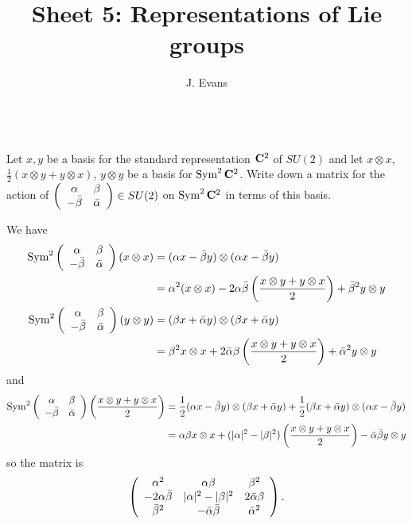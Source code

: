 \documentclass[12pt]{article}
\title{Sheet 5: Representations of Lie groups}
\author{J. Evans}
\date{}
\begin{document}
\maketitle

\begin{question}\ \\
Let $x,y$ be a basis for the standard representation $\mathbf{C}^2$ of $SU(2)$ and let $x\otimes x$, $\frac{1}{2}(x\otimes y+y\otimes x)$, $y\otimes y$ be a basis for $\operatorname{Sym}^2\mathbf{C}^2$. Write down a matrix for the action of $\left(\begin{array}{cc}\alpha & \beta\\ -\bar{\beta} & \bar{\alpha}\end{array}\right)\in SU(2)$ on $\operatorname{Sym}^2\mathbf{C}^2$ in terms of this basis.
\end{question}

\begin{answer}
We have
\begin{align*}
\operatorname{Sym}^2\left(\begin{array}{cc}\alpha & \beta\\ -\bar{\beta} & \bar{\alpha}\end{array}\right)(x\otimes x)&=(\alpha x-\bar{\beta} y)\otimes(\alpha x-\bar{\beta} y)\\
&=\alpha^2(x\otimes x)-2\alpha\bar{\beta}\left(\frac{x\otimes y+y\otimes x}{2}\right)+\bar{\beta}^2y\otimes y\\
\operatorname{Sym}^2\left(\begin{array}{cc}\alpha & \beta\\ -\bar{\beta} & \bar{\alpha}\end{array}\right)(y\otimes y)&=(\beta x+\bar{\alpha} y)\otimes(\beta x+\bar{\alpha} y)\\
&=\beta^2x\otimes x+2\bar{\alpha}\beta\left(\frac{x\otimes y+y\otimes x}{2}\right)+\bar{\alpha}^2y\otimes y
\end{align*}
and
\begin{align*}
\operatorname{Sym}^2\left(\begin{array}{cc}\alpha & \beta\\ -\bar{\beta} & \bar{\alpha}\end{array}\right)\left(\frac{x\otimes y+y\otimes x}{2}\right)&=\frac{1}{2}(\alpha x-\bar{\beta} y)\otimes(\beta x+\bar{\alpha}y)+\frac{1}{2}({\beta}x+\bar{\alpha}y)\otimes(\alpha x-\bar{\beta} y)\\
&=\alpha{\beta}x\otimes x+(|\alpha|^2-|\beta|^2)\left(\frac{x\otimes y+y\otimes x}{2}\right)-\bar{\alpha}\bar{\beta} y\otimes y
\end{align*}
so the matrix is
\[\left(\begin{array}{ccc}\alpha^2 & \alpha{\beta} & {\beta}^2\\-2\alpha\bar{\beta} & |\alpha|^2-|\beta|^2 & 2\bar{\alpha}\beta\\\bar{\beta}^2 & -\bar{\alpha}\bar{\beta} & \bar{\alpha}^2\end{array}\right).\]
\end{answer}
\newpage


\bigskip
\end{document}
